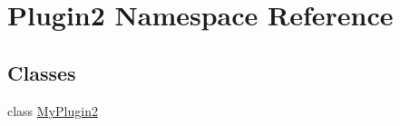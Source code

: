 \hypertarget{namespace_plugin2}{\section{Plugin2 Namespace Reference}
\label{namespace_plugin2}
}
\subsection*{Classes}
\begin{DoxyCompactItemize}
\item 
class \hyperlink{class_plugin2_1_1_my_plugin2}{My\-Plugin2}
\end{DoxyCompactItemize}
